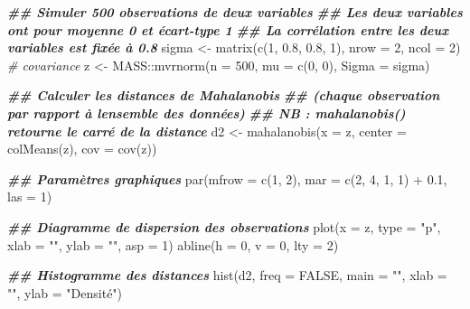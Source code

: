 \documentclass[
  french,
]{scrbook}
\newenvironment{Shaded}{\begin{snugshade}}{\end{snugshade}}
\newcommand{\AttributeTok}[1]{\textcolor[rgb]{0.77,0.63,0.00}{#1}}
\newcommand{\CommentTok}[1]{\textcolor[rgb]{0.56,0.35,0.01}{\textit{#1}}}
\newcommand{\ConstantTok}[1]{\textcolor[rgb]{0.00,0.00,0.00}{#1}}
\newcommand{\DecValTok}[1]{\textcolor[rgb]{0.00,0.00,0.81}{#1}}
\newcommand{\DocumentationTok}[1]{\textcolor[rgb]{0.56,0.35,0.01}{\textbf{\textit{#1}}}}
\newcommand{\FloatTok}[1]{\textcolor[rgb]{0.00,0.00,0.81}{#1}}
\newcommand{\FunctionTok}[1]{\textcolor[rgb]{0.00,0.00,0.00}{#1}}
\newcommand{\NormalTok}[1]{#1}
\newcommand{\OtherTok}[1]{\textcolor[rgb]{0.56,0.35,0.01}{#1}}
\newcommand{\SpecialCharTok}[1]{\textcolor[rgb]{0.00,0.00,0.00}{#1}}
\newcommand{\StringTok}[1]{\textcolor[rgb]{0.31,0.60,0.02}{#1}}
\begin{document}
\begin{Shaded}
\begin{Highlighting}[]
\DocumentationTok{\#\# Simuler 500 observations de deux variables }
\DocumentationTok{\#\# Les deux variables ont pour moyenne 0 et écart{-}type 1}
\DocumentationTok{\#\# La corrélation entre les deux variables est fixée à 0.8}
\NormalTok{sigma }\OtherTok{\textless{}{-}} \FunctionTok{matrix}\NormalTok{(}\FunctionTok{c}\NormalTok{(}\DecValTok{1}\NormalTok{, }\FloatTok{0.8}\NormalTok{, }\FloatTok{0.8}\NormalTok{, }\DecValTok{1}\NormalTok{), }\AttributeTok{nrow =} \DecValTok{2}\NormalTok{, }\AttributeTok{ncol =} \DecValTok{2}\NormalTok{) }\CommentTok{\# covariance}
\NormalTok{z }\OtherTok{\textless{}{-}}\NormalTok{ MASS}\SpecialCharTok{::}\FunctionTok{mvrnorm}\NormalTok{(}\AttributeTok{n =} \DecValTok{500}\NormalTok{, }\AttributeTok{mu =} \FunctionTok{c}\NormalTok{(}\DecValTok{0}\NormalTok{, }\DecValTok{0}\NormalTok{), }\AttributeTok{Sigma =}\NormalTok{ sigma)}

\DocumentationTok{\#\# Calculer les distances de Mahalanobis}
\DocumentationTok{\#\# (chaque observation par rapport à l\textquotesingle{}ensemble des données)}
\DocumentationTok{\#\# NB : mahalanobis() retourne le carré de la distance}
\NormalTok{d2 }\OtherTok{\textless{}{-}} \FunctionTok{mahalanobis}\NormalTok{(}\AttributeTok{x =}\NormalTok{ z, }\AttributeTok{center =} \FunctionTok{colMeans}\NormalTok{(z), }\AttributeTok{cov =} \FunctionTok{cov}\NormalTok{(z))}

\DocumentationTok{\#\# Paramètres graphiques}
\FunctionTok{par}\NormalTok{(}\AttributeTok{mfrow =} \FunctionTok{c}\NormalTok{(}\DecValTok{1}\NormalTok{, }\DecValTok{2}\NormalTok{), }\AttributeTok{mar =} \FunctionTok{c}\NormalTok{(}\DecValTok{2}\NormalTok{, }\DecValTok{4}\NormalTok{, }\DecValTok{1}\NormalTok{, }\DecValTok{1}\NormalTok{) }\SpecialCharTok{+} \FloatTok{0.1}\NormalTok{, }\AttributeTok{las =} \DecValTok{1}\NormalTok{)}

\DocumentationTok{\#\# Diagramme de dispersion des observations}
\FunctionTok{plot}\NormalTok{(}\AttributeTok{x =}\NormalTok{ z, }\AttributeTok{type =} \StringTok{"p"}\NormalTok{, }\AttributeTok{xlab =} \StringTok{""}\NormalTok{, }\AttributeTok{ylab =} \StringTok{""}\NormalTok{, }\AttributeTok{asp =} \DecValTok{1}\NormalTok{)}
\FunctionTok{abline}\NormalTok{(}\AttributeTok{h =} \DecValTok{0}\NormalTok{, }\AttributeTok{v =} \DecValTok{0}\NormalTok{, }\AttributeTok{lty =} \DecValTok{2}\NormalTok{)}

\DocumentationTok{\#\# Histogramme des distances}
\FunctionTok{hist}\NormalTok{(d2, }\AttributeTok{freq =} \ConstantTok{FALSE}\NormalTok{, }\AttributeTok{main =} \StringTok{""}\NormalTok{, }\AttributeTok{xlab =} \StringTok{""}\NormalTok{, }\AttributeTok{ylab =} \StringTok{"Densité"}\NormalTok{)}


\end{Highlighting}
\end{Shaded}
\end{document}
